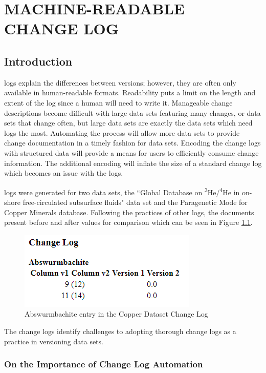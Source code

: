\chapter{MACHINE-READABLE CHANGE LOG}\label{ch:changelog}

\section{Introduction}

\Glspl{log} explain the differences between \glspl{version}; however, they are often only available in human-readable formats.
Readability puts a limit on the length and extent of the \gls{log} since a human will need to write it.
Manageable change descriptions become difficult with large data sets featuring many changes, or data sets that change often, but large data sets are exactly the data sets which need \glspl{log} the most.
Automating the process will allow more data sets to provide change documentation in a timely fashion for data sets.
Encoding the change logs with structured data will provide a means for users to efficiently consume change information.
The additional encoding will inflate the size of a standard change log which becomes an issue with the \glspl{log}.


\Glspl{log} were generated for two data sets, the ``Global Database on \textsuperscript{3}He/\-\textsuperscript{4}He in on-shore free-circulated subsurface fluids" data set and the Paragenetic Mode for Copper Minerals database.
Following the practices of other \glspl{log}, the documents present before and after values for comparison which can be seen in Figure \ref{changelog_zoomed}.
\begin{figure}
	\centering
	\includegraphics[scale=0.80]{figures/Changelog-zoomed.png}
	\caption{Abswurmbachite entry in the Copper Dataset Change Log}
	\label{changelog_zoomed}
\end{figure}
The change logs identify challenges to adopting thorough change logs as a practice in versioning data sets.

\subsection{On the Importance of Change Log Automation}

